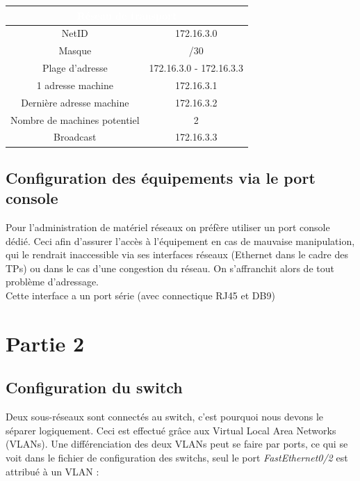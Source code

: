 \documentclass[12pt,a4paper,notitlepage]{article}
\begin{document}
\begin{center}
\begin{tabular}{|c|c|}
  \hline
  \multicolumn{2}{|c|}{\cellcolor{bleup}\textcolor{white}{Réseau de transport}} \\
  \hline
  NetID & 172.16.3.0 \\
  Masque & /30  \\
  Plage d'adresse & 172.16.3.0 - 172.16.3.3\\
  1\up{ère} adresse machine & 172.16.3.1\\
  Dernière adresse machine&  172.16.3.2\\
  Nombre de machines potentiel & 2\\
  Broadcast & 172.16.3.3\\
  \hline
\end{tabular}
\end{center}




\subsection{Configuration des équipements via le port console}

Pour l'administration de matériel réseaux on préfère utiliser un port console dédié. Ceci afin d'assurer l'accès à l'équipement en cas de mauvaise manipulation, qui le rendrait inaccessible via ses interfaces réseaux (Ethernet dans le cadre des TPs) ou dans le cas d'une congestion du réseau. On s'affranchit alors de tout problème d'adressage.\\

Cette interface a un port série (avec connectique RJ45 et DB9) 


\section{Partie 2}
\subsection{Configuration du switch}

Deux sous-réseaux sont connectés au switch, c'est pourquoi nous devons le séparer logiquement. Ceci est effectué grâce aux Virtual Local Area Networks (VLANs). Une différenciation des deux VLANs peut se faire par ports, ce qui se voit dans le fichier de configuration des switchs, seul le port \textit{FastEthernet0/2} est attribué à un VLAN :

\begin{center}
 \end{center}
 
\end{document}
